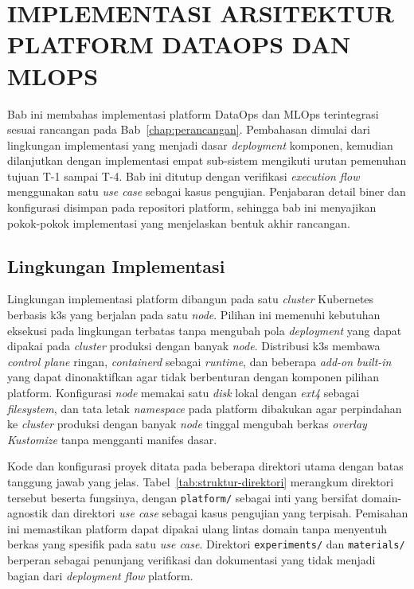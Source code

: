 \cleardoublepage
\chapter{IMPLEMENTASI ARSITEKTUR PLATFORM DATAOPS DAN MLOPS}
\label{chap:implementasi}

Bab ini membahas implementasi platform DataOps dan MLOps terintegrasi sesuai rancangan pada Bab~\ref{chap:perancangan}. Pembahasan dimulai dari lingkungan implementasi yang menjadi dasar \textit{deployment} komponen, kemudian dilanjutkan dengan implementasi empat sub-sistem mengikuti urutan pemenuhan tujuan T-1 sampai T-4. Bab ini ditutup dengan verifikasi \textit{execution flow} menggunakan satu \textit{use case} sebagai kasus pengujian. Penjabaran detail biner dan konfigurasi disimpan pada repositori platform, sehingga bab ini menyajikan pokok-pokok implementasi yang menjelaskan bentuk akhir rancangan.

\section{Lingkungan Implementasi}
\label{sec:lingkungan}

Lingkungan implementasi platform dibangun pada satu \textit{cluster} Kubernetes \autocite{kubernetes2024} berbasis k3s yang berjalan pada satu \textit{node}. Pilihan ini memenuhi kebutuhan eksekusi pada lingkungan terbatas tanpa mengubah pola \textit{deployment} yang dapat dipakai pada \textit{cluster} produksi dengan banyak \textit{node}. Distribusi k3s membawa \textit{control plane} ringan, \textit{containerd} sebagai \textit{runtime}, dan beberapa \textit{add-on} \textit{built-in} yang dapat dinonaktifkan agar tidak berbenturan dengan komponen pilihan platform. Konfigurasi \textit{node} memakai satu \textit{disk} lokal dengan \textit{ext4} sebagai \textit{filesystem}, dan tata letak \textit{namespace} pada platform dibakukan agar perpindahan ke \textit{cluster} produksi dengan banyak \textit{node} tinggal mengubah berkas \textit{overlay} \textit{Kustomize} tanpa mengganti manifes dasar.

Kode dan konfigurasi proyek ditata pada beberapa direktori utama dengan batas tanggung jawab yang jelas. Tabel~\ref{tab:struktur-direktori} merangkum direktori tersebut beserta fungsinya, dengan \texttt{platform/} sebagai inti yang bersifat domain-agnostik dan direktori \textit{use case} sebagai kasus pengujian yang terpisah. Pemisahan ini memastikan platform dapat dipakai ulang lintas domain tanpa menyentuh berkas yang spesifik pada satu \textit{use case}. Direktori \texttt{experiments/} dan \texttt{materials/} berperan sebagai penunjang verifikasi dan dokumentasi yang tidak menjadi bagian dari \textit{deployment flow} platform.

